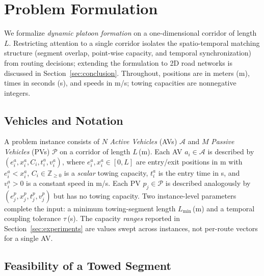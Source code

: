 \documentclass[sigconf]{acmart}
\begin{document}
\section{Problem Formulation}
\label{sec:formulation}

We formalize \emph{dynamic platoon formation} on a one-dimensional corridor of length $L$. Restricting attention to a single corridor isolates the spatio-temporal matching structure (segment overlap, point-wise capacity, and temporal synchronization) from routing decisions; extending the formulation to 2D road networks is discussed in Section~\ref{sec:conclusion}. Throughout, positions are in meters (m), times in seconds (s), and speeds in m/s; towing capacities are nonnegative integers.

\subsection{Vehicles and Notation}
\label{sec:notation}

A problem instance consists of $N$ \emph{Active Vehicles} (AVs) $\mathcal{A}$ and $M$ \emph{Passive Vehicles} (PVs) $\mathcal{P}$ on a corridor of length $L$\,(m). Each AV $a_i\!\in\!\mathcal{A}$ is described by $(e^a_i, x^a_i, C_i, t^a_i, v^a_i)$, where $e^a_i,x^a_i\!\in\![0,L]$ are entry/exit positions in m with $e^a_i\!<\!x^a_i$, $C_i\!\in\!\mathbb{Z}_{\ge 0}$ is a \emph{scalar} towing capacity, $t^a_i$ is the entry time in s, and $v^a_i\!>\!0$ is a constant speed in m/s. Each PV $p_j\!\in\!\mathcal{P}$ is described analogously by $(e^p_j, x^p_j, t^p_j, v^p_j)$ but has no towing capacity. Two instance-level parameters complete the input: a minimum towing-segment length $L_{\min}$\,(m) and a temporal coupling tolerance $\tau$\,(s). The capacity \emph{ranges} reported in Section~\ref{sec:experiments} are values swept across instances, not per-route vectors for a single AV.

\subsection{Feasibility of a Towed Segment}
\label{sec:feasibility}
\end{document}
